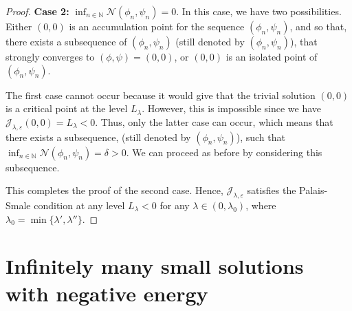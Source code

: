 \documentclass[10pt,a4paper]{amsart}
\numberwithin{equation}{section}
\begin{document}
\begin{proof}
\noindent\textbf{Case 2:}
 $\inf_{n\in \mathbb{N}} \mathcal{N}(\phi_n,\psi_n)=0$. In this case, we have two 
possibilities. Either $(0,0)$ is an accumulation point for the sequence 
$(\phi_n,\psi_n)$, and so that, there exists a subsequence of $(\phi_n,\psi_n)$ 
(still denoted by $(\phi_n,\psi_n)$), that strongly converges to $(\phi,\psi)=(0,0)$, 
or $(0,0)$ is an isolated point of $(\phi_n,\psi_n)$.

The first case cannot occur because it would give that the trivial solution $(0,0)$ 
is a critical point at the level $L_\lambda$. However, this is impossible since we have 
$\mathcal{J}_{\lambda,\varepsilon}(0,0)=L_\lambda<0$. Thus, only the latter case 
can occur, which means that there exists a subsequence, (still denoted by 
$(\phi_n,\psi_n)$), such that $\inf_{n\in\mathbb{N}}\mathcal{N}(\phi_n,\psi_n)=\delta>0$. 
We can proceed as before by considering this subsequence.

This completes the proof of the second case. 
Hence, $\mathcal{J}_{\lambda,\varepsilon}$ satisfies the Palais-Smale condition at any 
level $L_\lambda<0$ for any $\lambda\in (0,\lambda_0)$, where 
$\lambda_0=\min \lbrace\lambda',\lambda'' \rbrace$.
\end{proof}

\section{Infinitely many small solutions with negative energy}
\end{document}
